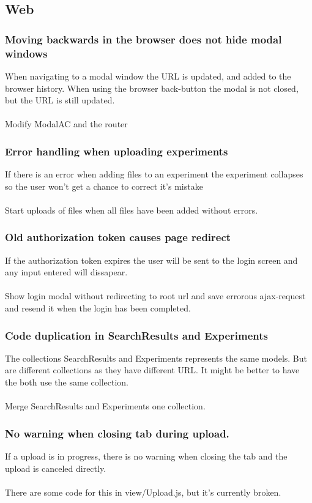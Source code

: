 \subsection{Web}
\subsubsection{Moving backwards in the browser does not hide modal windows}
When navigating to a modal window the URL is updated, and added to the browser history. When using the browser back-button the modal is not closed, but the URL is still updated. \\
\\
 Modify ModalAC and the router
\subsubsection{Error handling when uploading experiments}
If there is an error when adding files to an experiment the experiment collapses so the user won't get a chance to correct it's mistake \\
\\
Start uploads of files when all files have been added without errors. 
\subsubsection{Old authorization token causes page redirect}
If the authorization token expires the user will be sent to the login screen and any input entered will dissapear. \\
\\
Show login modal without redirecting to root url and save errorous ajax-request and resend it when the login has been completed.
\subsubsection{Code duplication in SearchResults and Experiments}
The collections SearchResults and Experiments represents the same models. But are different collections as they have different URL. It might be better to have the both use the same collection. \\
\\
Merge SearchResults and Experiments one collection.
\subsubsection{No warning when closing tab during upload.}
If a upload is in progress, there is no warning when closing the tab and the upload is canceled directly. \\
\\
There are some code for this in view/Upload.js, but it's currently broken.

